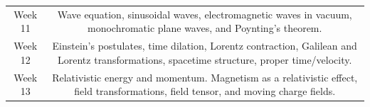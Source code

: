 \documentclass[11pt]{article}
\begin{document}
\begin{table}[h!]
\begin{tabular}{ | c | c | }
\begin{minipage}{.85\textwidth}
\end{minipage} \\
\hline
Week 11 & \begin{minipage}{.85\textwidth}

	\vspace{1mm}
	Wave equation, sinusoidal waves, electromagnetic waves in vacuum, monochromatic plane waves, and Poynting’s theorem.
	\vspace{1mm}

\end{minipage} \\
\hline
Week 12 & \begin{minipage}{.85\textwidth}

	\vspace{1mm}
	Einstein’s postulates, time dilation, Lorentz contraction, Galilean and Lorentz transformations, spacetime structure, proper time/velocity.
	\vspace{1mm}

\end{minipage} \\
\hline
Week 13 & \begin{minipage}{.85\textwidth}

	\vspace{1mm}
	Relativistic energy and momentum. Magnetism as a relativistic effect, field transformations, field tensor, and moving charge fields.
	\vspace{1mm}

\end{minipage} \\
\hline

\end{tabular} 
\end{table}

\newpage
\end{document}
